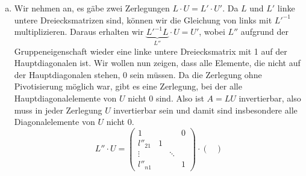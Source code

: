 \documentclass{article}
\theoremstyle{definition}
\begin{document}
\begin{enumerate}[(a)]
\begin{proof}
$$\begin{pmatrix}
                  \end{pmatrix}= \begin{pmatrix}
                      1 & 0 & 0 \\
                      1 & 1 & 0 \\
                      1 & 1 & 1
                  \end{pmatrix}\neq \begin{pmatrix}
                      1 & 0 & 0 \\
                      1 & 1 & 0 \\
                      0 & 1 & 1
                  \end{pmatrix}= \begin{pmatrix}
                      1 & 0 & 0 \\
                      1 & 1 & 0 \\
                      0 & 0 & 1
                  \end{pmatrix}\cdot \begin{pmatrix}
                      1 & 0 & 0 \\
                      0 & 1 & 0 \\
                      0 & 1 & 1
                  \end{pmatrix}$$
          \end{proof}
    \item Wir nehmen an, es gäbe zwei Zerlegungen $L \cdot U = L' \cdot U'$. Da $L$ und $L'$ linke untere Dreiecksmatrizen sind, können wir die Gleichung von links mit $L'^{-1}$ multiplizieren. Daraus erhalten wir $\underbrace{L'^{-1}L}_{L''} \cdot U = U'$, wobei $L''$ aufgrund der Gruppeneigenschaft wieder eine linke untere Dreiecksmatrix mit 1 auf der Hauptdiagonalen ist. Wir wollen nun zeigen, dass alle Elemente, die nicht auf der Hauptdiagonalen stehen, 0 sein müssen. Da die Zerlegung ohne Pivotisierung möglich war, gibt es eine Zerlegung, bei der alle Hauptdiagonalelemente von $U$ nicht 0 sind. Also ist $A = LU$ invertierbar, also muss in jeder Zerlegung $U$ invertierbar sein und damit sind insbesondere alle Diagonalelemente von $U$ nicht 0.
          \[
              L'' \cdot U = \begin{pmatrix}
                  1        &   &        & 0 \\
                  l''_{21} & 1 &        &   \\
                  \vdots   &   & \ddots &   \\
                  l''_{n1} &   &        & 1
              \end{pmatrix} \cdot \begin{pmatrix}

\end{pmatrix}\]
\end{enumerate}
\end{document}
